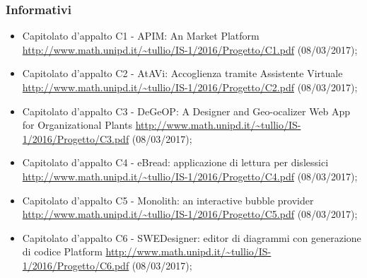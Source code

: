 \documentclass[../StudiodiFattibilita.tex]{subfiles}
\begin{document}
			\subsubsection{Informativi}
			\begin{itemize}
				\item Capitolato d'appalto C1 - APIM: An  Market Platform 
				\url{http://www.math.unipd.it/~tullio/IS-1/2016/Progetto/C1.pdf} (08/03/2017);
				\item Capitolato d'appalto C2 - AtAVi: Accoglienza tramite Assistente Virtuale 
				\url{http://www.math.unipd.it/~tullio/IS-1/2016/Progetto/C2.pdf} (08/03/2017);
				\item Capitolato d'appalto C3 - DeGeOP: A Designer and Geo-ocalizer Web App for Organizational Plants 
				\url{http://www.math.unipd.it/~tullio/IS-1/2016/Progetto/C3.pdf} (08/03/2017);
				\item Capitolato d'appalto C4 - eBread: applicazione di lettura per dislessici 
				\url{http://www.math.unipd.it/~tullio/IS-1/2016/Progetto/C4.pdf} (08/03/2017);
				\item Capitolato d'appalto C5 - Monolith: an interactive bubble provider 
				\url{http://www.math.unipd.it/~tullio/IS-1/2016/Progetto/C5.pdf} (08/03/2017);
				\item Capitolato d'appalto C6 - SWEDesigner: editor di diagrammi  con generazione di codice Platform 
				\url{http://www.math.unipd.it/~tullio/IS-1/2016/Progetto/C6.pdf} (08/03/2017);
			\end{itemize}
\end{document}
